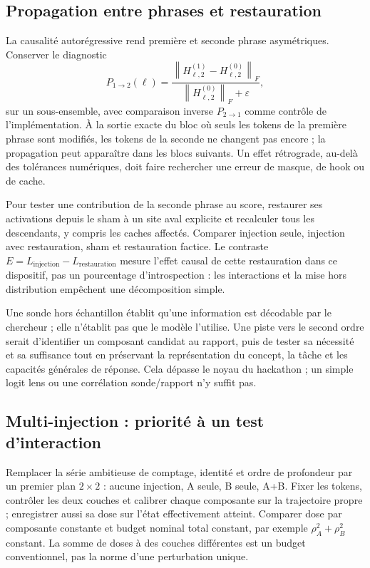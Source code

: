 \documentclass[10pt,a4paper]{article}
\newcommand{\norm}[1]{\left\lVert#1\right\rVert}
\begin{document}
\subsection{Propagation entre phrases et restauration}
La causalité autorégressive rend première et seconde phrase asymétriques. Conserver le diagnostic
\[
P_{1\to2}(\ell)=\frac{\norm{H^{(1)}_{\ell,2}-H^{(0)}_{\ell,2}}_F}{\norm{H^{(0)}_{\ell,2}}_F+\varepsilon},
\]
sur un sous-ensemble, avec comparaison inverse $P_{2\to1}$ comme contrôle de l'implémentation. À la sortie exacte du bloc où seuls les tokens de la première phrase sont modifiés, les tokens de la seconde ne changent pas encore ; la propagation peut apparaître dans les blocs suivants. Un effet rétrograde, au-delà des tolérances numériques, doit faire rechercher une erreur de masque, de hook ou de cache.

Pour tester une contribution de la seconde phrase au score, restaurer ses activations depuis le sham à un site aval explicite et recalculer tous les descendants, y compris les caches affectés. Comparer injection seule, injection avec restauration, sham et restauration factice. Le contraste $E=L_{\mathrm{injection}}-L_{\mathrm{restauration}}$ mesure l'effet causal de cette restauration dans ce dispositif, pas un \og pourcentage d'introspection\fg{} : les interactions et la mise hors distribution empêchent une décomposition simple.

Une sonde hors échantillon établit qu'une information est décodable par le chercheur ; elle n'établit pas que le modèle l'utilise. Une piste vers le second ordre serait d'identifier un composant candidat au rapport, puis de tester sa nécessité et sa suffisance tout en préservant la représentation du concept, la tâche et les capacités générales de réponse. Cela dépasse le noyau du hackathon ; un simple logit lens ou une corrélation sonde/rapport n'y suffit pas.

\subsection{Multi-injection : priorité à un test d'interaction}
Remplacer la série ambitieuse de comptage, identité et ordre de profondeur par un premier plan $2\times2$ : aucune injection, A seule, B seule, A+B. Fixer les tokens, contrôler les deux couches et calibrer chaque composante sur la trajectoire propre ; enregistrer aussi sa dose sur l'état effectivement atteint. Comparer dose par composante constante et budget nominal total constant, par exemple $\rho_A^2+\rho_B^2$ constant. La somme de doses à des couches différentes est un budget conventionnel, pas la norme d'une perturbation unique.
\end{document}
